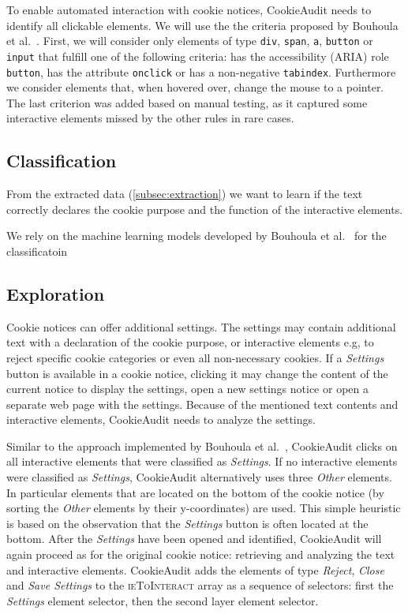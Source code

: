 To enable automated interaction with cookie notices, CookieAudit needs to identify all clickable elements.
We will use the the criteria proposed by Bouhoula et al.~\cite{bouhoula2023automated}.
First, we will consider only elements of type \verb|div|, \verb|span|, \verb|a|, \verb|button| or \verb|input| that fulfill one of the following criteria: 
has the accessibility (ARIA) role \verb|button|, 
has the attribute \verb|onclick| or
has a non-negative \verb|tabindex|.
Furthermore we consider elements that, when hovered over, change the mouse to a pointer.
The last criterion was added based on manual testing, as it captured some interactive elements missed by the other rules in rare cases.

\subsection{Classification}
From the extracted data (\cref{subsec:extraction}) we want to learn if the text correctly declares the cookie purpose and the function of the interactive elements. 

We rely on the machine learning models developed by Bouhoula et al.~\cite{bouhoula2023automated} for the classificatoin

\subsection{Exploration}
Cookie notices can offer additional settings.
The settings may contain additional text with a declaration of the cookie purpose, or interactive elements e.g, to reject specific cookie categories or even all non-necessary cookies.
If a \emph{Settings} button is available in a cookie notice, clicking it may change the content of the current notice to display the settings, open a new settings notice or open a separate web page with the settings.
Because of the mentioned text contents and interactive elements, CookieAudit needs to analyze the settings.

Similar to the approach implemented by Bouhoula et al.~\cite{bouhoula2023automated}, CookieAudit clicks on all interactive elements that were classified as \emph{Settings}.
If no interactive elements were classified as \emph{Settings}, CookieAudit alternatively uses three \emph{Other} elements. 
In particular elements that are located on the bottom of the cookie notice (by sorting the \emph{Other} elements by their y-coordinates) are used.
This simple heuristic is based on the observation that the \emph{Settings} button is often located at the bottom.
After the \emph{Settings} have been opened and identified, CookieAudit will again proceed as for the original cookie notice: retrieving and analyzing the text and interactive elements.
CookieAudit adds the elements of type \emph{Reject}, \emph{Close} and \emph{Save Settings} to the \textsc{ieToInteract} array as a sequence of selectors: first the \emph{Settings} element selector, then the second layer element selector. 

